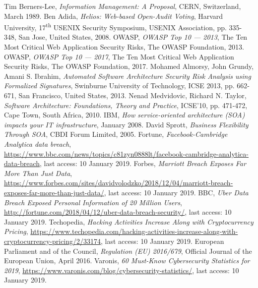\documentclass{article} %
\begin{document}
\begin{thebibliography}{9}
Tim Berners-Lee, \emph{Information Management: A Proposal}, CERN, Switzerland, March 1989.
Ben Adida, \emph{Helios: Web-based Open-Audit Voting}, Harvard University, 17\textsuperscript{th} USENIX Security Symposium, USENIX Association, pp. 335-348, San Jose, United States, 2008.
OWASP, \emph{OWASP Top 10 --- 2013}, The Ten Most Critical Web Application Security Risks, The OWASP Foundation, 2013.
OWASP, \emph{OWASP Top 10 --- 2017}, The Ten Most Critical Web Application Security Risks, The OWASP Foundation, 2017.
Mohamed Almorsy, John Grundy, Amani S. Ibrahim, \emph{Automated Software Architecture Security Risk Analysis using Formalized Signatures}, Swinburne University of Technology, ICSE 2013, pp. 662-671, San Francisco, United States, 2013.
Nenad Medvidovic, Richard N. Taylor, \emph{Software Architecture: Foundations, Theory and Practice}, ICSE'10, pp. 471-472, Cape Town, South Africa, 2010.
IBM, \emph{How service-oriented architecture (SOA) impacts your IT infrastructure}, January 2008.
David Sprott, \emph{Business Flexibility Through SOA}, CBDI Forum Limited, 2005.
Fortune, \emph{Facebook-Cambridge Analytica data breach}, \url{https://www.bbc.com/news/topics/c81zyn0888lt/facebook-cambridge-analytica-data-breach}, last access: 10 January 2019.
Forbes, \emph{Marriott Breach Exposes Far More Than Just Data}, \url{https://www.forbes.com/sites/davidvolodzko/2018/12/04/marriott-breach-exposes-far-more-than-just-data/}, last access: 10 January 2019.
BBC, \emph{Uber Data Breach Exposed Personal Information of 20 Million Users}, \url{http://fortune.com/2018/04/12/uber-data-breach-security/}, last access: 10 January 2019.
Techopedia, \emph{Hacking Activities Increase Along with Cryptocurrency Pricing}, \url{https://www.techopedia.com/hacking-activities-increase-along-with-cryptocurrency-pricing/2/33174}, last access: 10 January 2019.
European Parliament and of the Council, \emph{Regulation (EU) 2016/679}, Official Journal of the European Union, April 2016.
Varonis, \emph{60 Must-Know Cybersecurity Statistics for 2019}, \url{https://www.varonis.com/blog/cybersecurity-statistics/}, last access: 10 January 2019.

\end{thebibliography}
\end{document}
